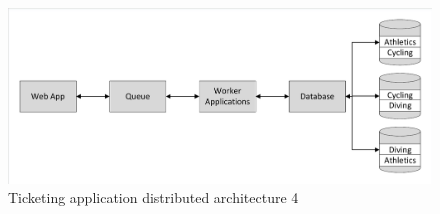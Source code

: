 \begin{figure}
	\caption{Ticketing application distributed architecture 4}
	\centering
	\includegraphics[trim = 5 5 5 5, clip, width=\textwidth]{img/sharedqueue_withrep}
\end{figure}